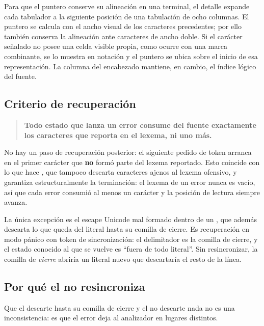 \documentclass[11pt,a4paper]{article}
\begin{document}
Para que el puntero conserve su alineación en una terminal, el detalle expande cada tabulador a la
siguiente posición de una tabulación de ocho columnas. El puntero se calcula con el ancho visual de
los caracteres precedentes; por ello también conserva la alineación ante caracteres de ancho doble.
Si el carácter señalado no posee una celda visible propia, como ocurre con una marca combinante, se
lo muestra en notación \lex{\\uXXXX} y el puntero se ubica sobre el inicio de esa representación.
La columna del encabezado mantiene, en cambio, el índice lógico del fuente.

\subsection{Criterio de recuperación}

\begin{quote}
\textbf{Todo estado que lanza un error consume del fuente exactamente los caracteres que reporta en
el lexema, ni uno más.}
\end{quote}

No hay un paso de recuperación posterior: el siguiente pedido de token arranca en el primer carácter
que \textbf{no} formó parte del lexema reportado. Esto coincide con lo que hace , que
tampoco descarta caracteres ajenos al lexema ofensivo, y garantiza estructuralmente la terminación:
el lexema de un error nunca es vacío, así que cada error consumió al menos un carácter y la posición
de lectura siempre avanza.

La única excepción es el escape Unicode mal formado dentro de un , que además descarta
lo que queda del literal hasta su comilla de cierre. Es recuperación en modo pánico con token de
sincronización: el delimitador es la comilla de cierre, y el estado conocido al que se vuelve es
``fuera de todo literal''. Sin resincronizar, la comilla de \emph{cierre} abriría un literal nuevo
que descartaría el resto de la línea.

\subsection{Por qué el  no resincroniza}
\label{sec:asimetria}

Que el  descarte hasta su comilla de cierre y el  no descarte nada no
es una inconsistencia: es que el error deja al analizador en lugares distintos.
\end{document}

